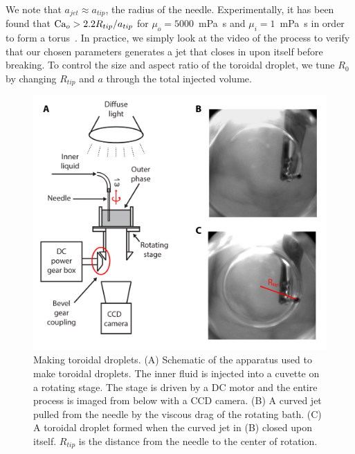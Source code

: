 We note that $a_{jet} \approx a_{tip}$, the radius of the needle.
Experimentally, it has been found that $\textup{Ca}_o > 2.2 R_{tip}/a_{tip}$ for $\mu_o = 5000$~mPa~s and $\mu_i = 1$~mPa~s in order to form a torus~\cite{RN29}.
In practice, we simply look at the video of the process to verify that our chosen parameters generates a jet that closes in upon itself before breaking.
To control the size and aspect ratio of the toroidal droplet, we tune $R_0$ by changing $R_{tip}$ and $a$ through the total injected volume.
\begin{figure}
  \centering
  \includegraphics{figures/C3/Ch3-Figs_MakeTorus.png}
  \caption{Making toroidal droplets.
  (A) Schematic of the apparatus used to make toroidal droplets.
  The inner fluid is injected into a cuvette on a rotating stage.
  The stage is driven by a DC motor and the entire process is imaged from below with a CCD camera.
  (B) A curved jet pulled from the needle by the viscous drag of the rotating bath.
  (C) A toroidal droplet formed when the curved jet in (B) closed upon itself.
  $R_{tip}$ is the distance from the needle to the center of rotation.}\label{f:3-MakeTorus}
\end{figure}

